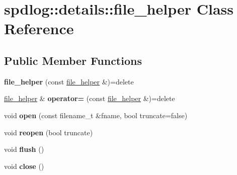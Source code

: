 \hypertarget{classspdlog_1_1details_1_1file__helper}{}\section{spdlog\+:\+:details\+:\+:file\+\_\+helper Class Reference}
\label{classspdlog_1_1details_1_1file__helper}
\subsection*{Public Member Functions}
\begin{DoxyCompactItemize}
\item 
{\bfseries file\+\_\+helper} (const \hyperlink{classspdlog_1_1details_1_1file__helper}{file\+\_\+helper} \&)=delete\hypertarget{classspdlog_1_1details_1_1file__helper_ab68b7720555f7656a8f387f8e0dcb37d}{}\label{classspdlog_1_1details_1_1file__helper_ab68b7720555f7656a8f387f8e0dcb37d}

\item 
\hyperlink{classspdlog_1_1details_1_1file__helper}{file\+\_\+helper} \& {\bfseries operator=} (const \hyperlink{classspdlog_1_1details_1_1file__helper}{file\+\_\+helper} \&)=delete\hypertarget{classspdlog_1_1details_1_1file__helper_a7c7314360e404efa02326feb7aa98442}{}\label{classspdlog_1_1details_1_1file__helper_a7c7314360e404efa02326feb7aa98442}

\item 
void {\bfseries open} (const filename\+\_\+t \&fname, bool truncate=false)\hypertarget{classspdlog_1_1details_1_1file__helper_a8612066fd098080cc60e3aefed6a6085}{}\label{classspdlog_1_1details_1_1file__helper_a8612066fd098080cc60e3aefed6a6085}

\item 
void {\bfseries reopen} (bool truncate)\hypertarget{classspdlog_1_1details_1_1file__helper_a21c688da7f241c53871b462c3a5c2c94}{}\label{classspdlog_1_1details_1_1file__helper_a21c688da7f241c53871b462c3a5c2c94}

\item 
void {\bfseries flush} ()\hypertarget{classspdlog_1_1details_1_1file__helper_a1a75f29ec0c13d9fbc269bcd8378b18b}{}\label{classspdlog_1_1details_1_1file__helper_a1a75f29ec0c13d9fbc269bcd8378b18b}

\item 
void {\bfseries close} ()\hypertarget{classspdlog_1_1details_1_1file__helper_a6a6d7a75014ae880857b4fe4fd01dc7a}{}\label{classspdlog_1_1details_1_1file__helper_a6a6d7a75014ae880857b4fe4fd01dc7a}


\end{DoxyCompactItemize}
